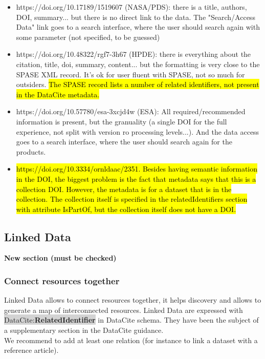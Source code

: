 \documentclass[11pt,a4paper]{ivoa}
\newcommand{\dataciteterm}[1]{\colorbox{lightgray}{DataCite:\textbf{#1}}}
\begin{document}
\begin{itemize}
    \item https://doi.org/10.17189/1519607 (NASA/PDS): there is a title, authors, DOI, summary... but there is no direct link to the data. The "Search/Access Data" link goes to a search interface, where the user should search again with some parameter (not specified, to be guessed)
    \item https://doi.org/10.48322/rgf7-3h67 (HPDE): there is everything about the citation, title, doi, summary, content... but the formatting is very close to the SPASE XML record. It's ok for user fluent with SPASE, not so much for outsiders.
    \hl{The SPASE record lists a number of related identifiers, not present in the DataCite metadata.}
    \item https://doi.org/10.57780/esa-3xcjd4w (ESA): All required/recommended information is present, but the granuality (a single DOI for the full experience, not split with version ro processing levels...). And the data access goes to a search interface, where the user should search again for the products.
    \item \hl{https://doi.org/10.3334/ornldaac/2351. Besides having semantic information in the DOI, the biggest problem is the fact that metadata says that this is a collection DOI. However, the metadata is for a dataset that is in the collection. The collection itself is specified in the relatedIdentifiers section with attribute IsPartOf, but the collection itself does not have a DOI.}
\end{itemize}


\subsection{Linked Data}
\label{sec:linkeddata}
\textbf{\color{red}New section (must be checked)}

\subsubsection{Connect resources together}
Linked Data allows to connect resources together, it helps discovery and allows to generate a map of interconnected resources. 
Linked Data are expressed with \dataciteterm{RelatedIdentifier} in DataCite schema. They have been the subject of a supplementary section in the DataCite guidance.\\

We recommend to add at least one relation (for instance to link a dataset with a reference article).\\
\end{document}
